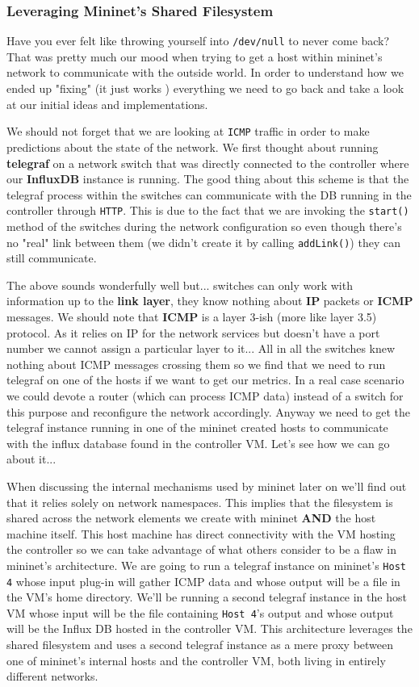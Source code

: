 \documentclass[12pt]{article}
\newcommand{\newpar} {
    \vskip 1cm
}
\begin{document}
		\subsubsection{Leveraging Mininet's Shared Filesystem}
			Have you ever felt like throwing yourself into \texttt{/dev/null} to never come back? That was pretty much our mood when trying to get a host within mininet's network to communicate with the outside world. In order to understand how we ended up "fixing" (it just works  ) everything we need to go back and take a look at our initial ideas and implementations.
			\newpar
			We should not forget that we are looking at \texttt{ICMP} traffic in order to make predictions about the state of the network. We first thought about running \textbf{telegraf} on a network switch that was directly connected to the controller where our \textbf{InfluxDB} instance is running. The good thing about this scheme is that the telegraf process within the switches can communicate with the DB running in the controller through \texttt{HTTP}. This is due to the fact that we are invoking the \texttt{start()} method of the switches during the network configuration so even though there's no "real" link between them (we didn't create it by calling \texttt{addLink()}) they can still communicate.
			\newpar
			The above sounds wonderfully well but... switches can only work with information up to the \textbf{link layer}, they know nothing about \textbf{IP} packets or \textbf{ICMP} messages. We should note that \textbf{ICMP} is a layer 3-ish (more like layer 3.5) protocol. As it relies on IP for the network services but doesn't have a port number we cannot assign a particular layer to it... All in all the switches knew nothing about ICMP messages crossing them so we find that we need to run telegraf on one of the hosts if we want to get our metrics. In a real case scenario we could devote a router (which can process ICMP data) instead of a switch for this purpose and reconfigure the network accordingly. Anyway we need to get the telegraf instance running in one of the mininet created hosts to communicate with the influx database found in the controller VM. Let's see how we can go about it...
			\newpar
			When discussing the internal mechanisms used by mininet later on we'll find out that it relies solely on network namespaces. This implies that the filesystem is shared across the network elements we create with mininet \textbf{AND} the host machine itself. This host machine has direct connectivity with the VM hosting the controller so we can take advantage of what others consider to be a flaw in mininet's architecture. We are going to run a telegraf instance on mininet's \texttt{Host 4} whose input plug-in will gather ICMP data and whose output will be a file in the VM's home directory. We'll be running a second telegraf instance in the host VM whose input will be the file containing \texttt{Host 4}'s output and whose output will be the Influx DB hosted in the controller VM. This architecture leverages the shared filesystem and uses a second telegraf instance as a mere proxy between one of mininet's internal hosts and the controller VM, both living in entirely different networks.
\end{document}
